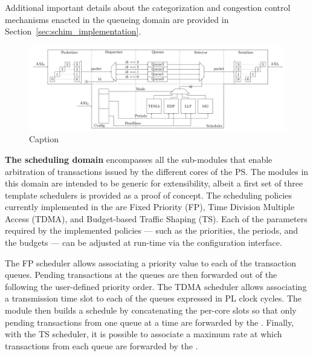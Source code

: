  Additional important details about the
categorization and congestion control mechanisms enacted in the
queueing domain are provided in
Section~\ref{sec:schim_implementation}.

\begin{figure}
  \centering
  \includegraphics[scale=0.08]{images/MemorEDF_module_schema.png}
  \caption{Caption}
  \label{fig:MemorEDF_module_schema}
\end{figure}

\par{\bf The scheduling domain} encompasses all the sub-modules that
enable arbitration of transactions issued by the different cores of
the PS. The modules in this domain are intended to be generic for
extensibility, albeit a first set of three template schedulers is
provided as a proof of concept.  The scheduling policies currently
implemented in the \schim are Fixed Priority (FP), Time Division
Multiple Access (TDMA), and Budget-based Traffic Shaping (TS).  Each
of the parameters required by the implemented policies --- such as the
priorities, the periods, and the budgets --- can be adjusted at
run-time via the configuration interface.

The FP scheduler allows associating a priority value to each of the
transaction queues. Pending transactions at the queues are then
forwarded out of the \schim following the user-defined priority
order. The TDMA scheduler allows associating a transmission time slot
to each of the queues expressed in PL clock cycles. The module then
builds a schedule by concatenating the per-core slots so that only
pending transactions from one queue at a time are forwarded by the
\schim. Finally, with the TS scheduler, it is possible to associate a
maximum rate at which transactions from each queue are forwarded by
the \schim. 




